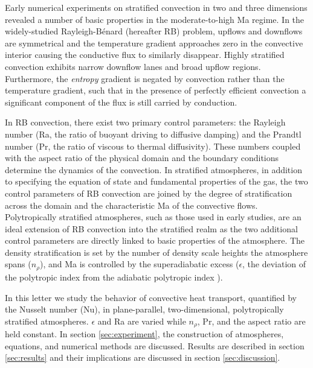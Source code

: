 \documentclass[aps, prl, twocolumn, nofootinbib, groupedaddress, amsfonts, amssymb, amsmath]{revtex4-1}
\newcommand{\RB}{Rayleigh-B\'{e}nard }
\newcommand{\nrho}{\ensuremath{n_{\rho}}}
\begin{document}
Early numerical experiments on stratified convection
in two \cite{graham1975, chan&all1982,
hurlburt&all1984, cattaneo&all1990} and three 
\cite{cattaneo&all1991, brummell&all1996} dimensions
revealed a number of basic properties in the moderate-to-high 
Ma regime. In the widely-studied \RB (hereafter RB) problem, 
upflows and downflows are symmetrical and
the temperature gradient approaches zero in the convective interior 
causing the conductive flux to similarly 
disappear.  Highly stratified convection exhibits narrow downflow 
lanes and broad upflow regions.
Furthermore, the \emph{entropy} gradient is negated by convection 
rather than the temperature gradient, such
that in the presence of perfectly efficient convection a significant 
component of the flux is still carried by conduction.

In RB convection, there exist two primary control parameters: 
the Rayleigh number (Ra, the ratio of
buoyant driving to diffusive damping) and the Prandtl number 
(Pr, the ratio of viscous to thermal
diffusivity).  These numbers coupled with the aspect ratio of 
the physical domain and the boundary conditions
determine the dynamics of the convection.  In stratified atmospheres, 
in addition to specifying the equation of state and
fundamental properties of the gas, the two control parameters of 
RB convection are joined by the degree of
stratification across the domain and the characteristic 
Ma of the convective flows.  
Polytropically stratified atmospheres, such as those used in 
early studies, are an ideal extension of
RB convection into the stratified realm as the two additional 
control parameters are directly linked to
basic properties of the atmosphere.  The density stratification is 
set by the number of density scale heights
the atmosphere spans (\nrho), and Ma is controlled 
by the superadiabatic excess ($\epsilon$,
the deviation of the polytropic index from the adiabatic polytropic 
index \cite{graham1975}).

In this letter we study the behavior of convective heat transport, quantified by
the Nusselt number (Nu), in plane-parallel, two-dimensional, polytropically stratified atmospheres.  
$\epsilon$ and Ra are varied  while $\nrho$, Pr, and the aspect ratio are held
constant.  In section 
\ref{sec:experiment}, the construction of atmospheres, equations, and numerical methods are discussed.  
Results are described in section \ref{sec:results} and their implications are discussed
in section \ref{sec:discussion}.
\end{document}
